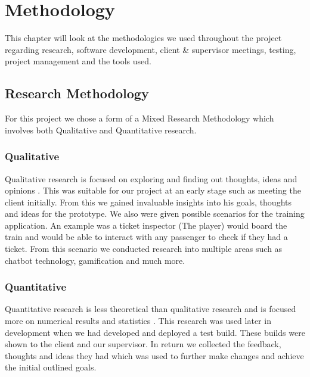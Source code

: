\chapter{Methodology}
This chapter will look at the methodologies we used throughout the project regarding research, software development, client \& supervisor meetings, testing, project management and the tools used.

\section{Research Methodology}
For this project we chose a form of a Mixed Research Methodology which involves both Qualitative and Quantitative research.

\subsection{Qualitative}
Qualitative research is focused on exploring and finding out thoughts, ideas and opinions \cite{tesch2013qualitative}. This was suitable for our project at an early stage such as meeting the client initially. From this we gained invaluable insights into his goals, thoughts and ideas for the prototype. We also were given possible scenarios for the training application. An example was a ticket inspector (The player) would board the train and would be able to interact with any passenger to check if they had a ticket. From this scenario we conducted research into multiple areas such as chatbot technology, gamification and much more.

\subsection{Quantitative}
Quantitative research is less theoretical than qualitative research and is focused more on numerical results and statistics \cite{sukamolson2007fundamentals}. This research was used later in development when we had developed and deployed a test build. These builds were shown to the client and our supervisor. In return we collected the feedback, thoughts and ideas they had which was used to further make changes and achieve the initial outlined goals.


